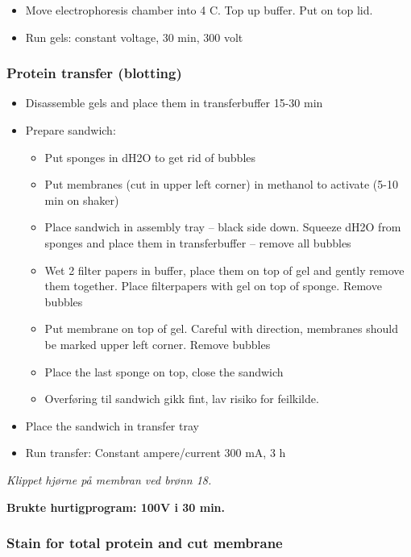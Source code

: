 \documentclass[
  letterpaper,
  DIV=11,
  numbers=noendperiod]{scrreprt}
\providecommand{\tightlist}{%
  \setlength{\itemsep}{0pt}\setlength{\parskip}{0pt}}\usepackage{longtable,booktabs,array}
\begin{document}
\begin{itemize}
\tightlist
\item
  Move electrophoresis chamber into 4 C. Top up buffer. Put on top lid.
\item
  Run gels: constant voltage, 30 min, 300 volt
\end{itemize}

\subsubsection{Protein transfer
(blotting)}\label{protein-transfer-blotting}

\begin{itemize}
\item
  Disassemble gels and place them in transferbuffer 15-30 min
\item
  Prepare sandwich:

  \begin{itemize}
  \tightlist
  \item
    Put sponges in dH2O to get rid of bubbles
  \item
    Put membranes (cut in upper left corner) in methanol to activate
    (5-10 min on shaker)
  \item
    Place sandwich in assembly tray -- black side down. Squeeze dH2O
    from sponges and place them in transferbuffer -- remove all bubbles
  \item
    Wet 2 filter papers in buffer, place them on top of gel and gently
    remove them together. Place filterpapers with gel on top of sponge.
    Remove bubbles
  \item
    Put membrane on top of gel. Careful with direction, membranes should
    be marked upper left corner. Remove bubbles
  \item
    Place the last sponge on top, close the sandwich
  \item
    Overføring til sandwich gikk fint, lav risiko for feilkilde.
  \end{itemize}
\item
  Place the sandwich in transfer tray
\item
  Run transfer: Constant ampere/current 300 mA, 3 h
\end{itemize}

\emph{Klippet hjørne på membran ved brønn 18.}

\textbf{Brukte hurtigprogram: 100V i 30 min.}

\subsubsection{Stain for total protein and cut
membrane}\label{stain-for-total-protein-and-cut-membrane}
\end{document}
